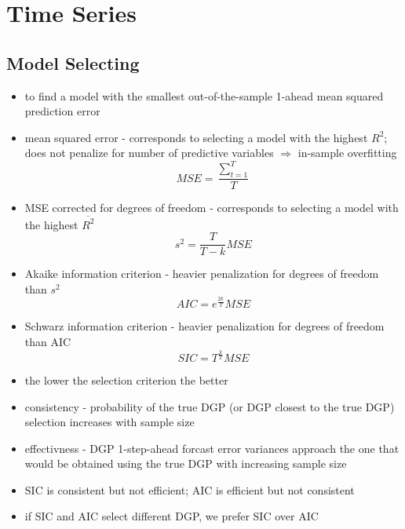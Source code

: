 \chapter{Time Series}

\section{Model Selecting}

\begin{itemize}
\item to find a model with the smallest out-of-the-sample 1-ahead mean squared prediction error
\item mean squared error - corresponds to selecting a model with the highest $R^2$; does not penalize for number of predictive variables $\Rightarrow$ in-sample overfitting
\begin{equation*}
MSE = \frac{\sum_{t=1}^T}{T}
\end{equation*}
\item MSE corrected for degrees of freedom - corresponds to selecting a model with the highest $\overline{R^2}$
\begin{equation*}
s^2 = \frac{T}{T - k} MSE
\end{equation*}
\item Akaike information criterion - heavier penalization for degrees of freedom than $s^2$
\begin{equation*}
AIC = e^{\frac{2k}{T}}MSE
\end{equation*}
\item Schwarz information criterion - heavier penalization for degrees of freedom than AIC
\begin{equation*}
SIC = T^{\frac{k}{T}}MSE
\end{equation*}
\item the lower the selection criterion the better
\item consistency - probability of the true DGP (or DGP closest to the true DGP) selection increases with sample size
\item effectivness - DGP 1-step-ahead forcast error variances approach the one that would be obtained using the true DGP with increasing sample size
\item SIC is consistent but not efficient; AIC is efficient but not consistent
\item if SIC and AIC select different DGP, we prefer SIC over AIC
\end{itemize}

